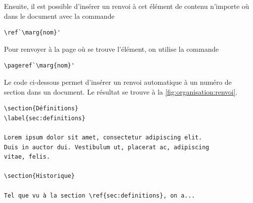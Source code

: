 Ensuite, il est possible d'insérer un renvoi à cet élément de contenu
n'importe où dans le document avec la commande
\begin{lstlisting}
\ref`\marg{nom}'
\end{lstlisting}
Pour renvoyer à la page où se trouve l'élément, on utilise la commande
\begin{lstlisting}
\pageref`\marg{nom}'
\end{lstlisting}

\begin{exemple}
  \label{ex:organisation:renvoi}
  Le code ci-dessous permet d'insérer un renvoi automatique à un
  numéro de section dans un document. Le résultat se trouve à la
  \autoref{fig:organisation:renvoi}.
\begin{lstlisting}[emph={\label,\ref}]
\section{Définitions}
\label{sec:definitions}

Lorem ipsum dolor sit amet, consectetur adipiscing elit.
Duis in auctor dui. Vestibulum ut, placerat ac, adipiscing
vitae, felis.

\section{Historique}

Tel que vu à la section \ref{sec:definitions}, on a...
\end{lstlisting}


\end{exemple}
